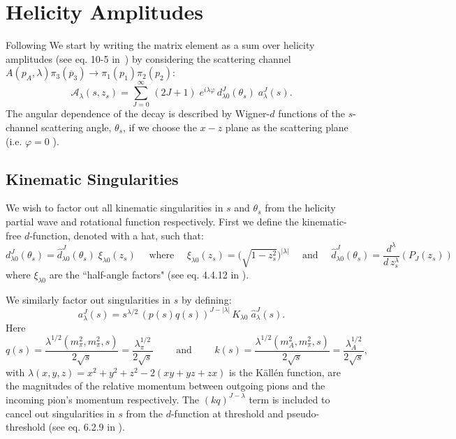 \documentclass[10pt, aps,prd,amsmath,amssymb,superscriptaddress,onecolumn,
nofootinbib,showpacs,preprintnumbers]{revtex4-1}
\begin{document}
\section{Helicity Amplitudes}
Following \cite{Mikhasenko:2017rkh} We start by writing the matrix element as a sum over helicity amplitudes (see eq. 10-5 in~\cite{perl}) by considering the scattering channel \(A(p_A, \lambda) \pi_3(\overline{p}_3) \to  \pi_1(p_1)\pi_2(p_2)\):
  \begin{equation}
    \label{eq:helicity}
    \mathcal{A}_\lambda(s,z_s) = \sum_{J= 0}^\infty \, (2J +1) \; e^{i\lambda\varphi} \, d_{\lambda0}^J(\theta_s) \; a_\lambda^J(s).
  \end{equation}
The angular dependence of the decay is described by Wigner-\(d\) functions of the \(s\)-channel scattering angle, \(\theta_s\), if we choose the \(x-z\) plane as the scattering plane (i.e. \(\varphi = 0 \) ).
\subsection{Kinematic Singularities}
\label{sec:kin-singularities}
We wish to factor out all kinematic singularities in \(s\) and \(\theta_s\) from the helicity partial wave and rotational function respectively. First we define the kinematic-free \(d\)-function, denoted with a hat, such that:
  \begin{equation}
      \label{eq:halfangle}
      d^J_{\lambda 0}(\theta_s) = \hat{d}^J_{\lambda 0}(\theta_s) \; \xi_{\lambda 0}(z_s) \quad \text{ where } \quad \xi_{\lambda 0}(z_s) = \bigg( \sqrt{ 1- z_s^2} \bigg)^{|\lambda|} \quad \text{ and } \quad \hat{d}^J_{\lambda 0}(\theta_s) = \frac{d^\lambda}{d \, z_s^\lambda} (P_J(z_s))
  \end{equation}
where \(\xi_{\lambda 0}\) are the ``half-angle factors" (see eq. 4.4.12 in \cite{Collins}).

We similarly factor out singularities in \(s\) by defining:
  \begin{equation}
    \label{eq:kinematicfreepartialwave}
    a^J_\lambda(s) = s^{\lambda/2} \, (p(s)q(s))^{J - |\lambda|} \, K_{\lambda 0} \; \hat{a}^J_\lambda(s).
  \end{equation}
Here
  \begin{equation}
    \label{eq:momenta}
    q(s) = \frac{\lambda^{1/2}(m_\pi^2, m_\pi^2, s)}{2\sqrt{s}} = \frac{\lambda_\pi^{1/2}}{2\sqrt{s}} \qquad \text{ and } \qquad k(s) = \frac{\lambda^{1/2}(m_A^2, m_\pi^2, s)}{2\sqrt{s}} = \frac{\lambda_A^{1/2}}{2\sqrt{s}} ,
  \end{equation}
with \(\lambda(x,y,z) = x^2 + y^2 + z^2 - 2 (xy + yz + zx)\) is the K\"{a}ll\'{e}n function, are the magnitudes of  the relative momentum between outgoing pions and the incoming pion's momentum respectively. The \((kq)^{J-\lambda}\) term is included to cancel out singularities in \(s\) from the \(d\)-function at threshold and pseudo-threshold (see eq. 6.2.9 in \cite{Collins}).
\end{document}

